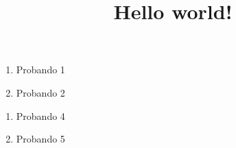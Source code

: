 \documentclass[spanish]{article}
\title{Hello world!}
\begin{document}
	\maketitle
	
	
	\begin{enumerate}
		\item Probando 1
		\item Probando 2
	\end{enumerate}
	
	\begin{enumerate}
		\item Probando 4
		\item Probando 5
	\end{enumerate}
\end{document}
